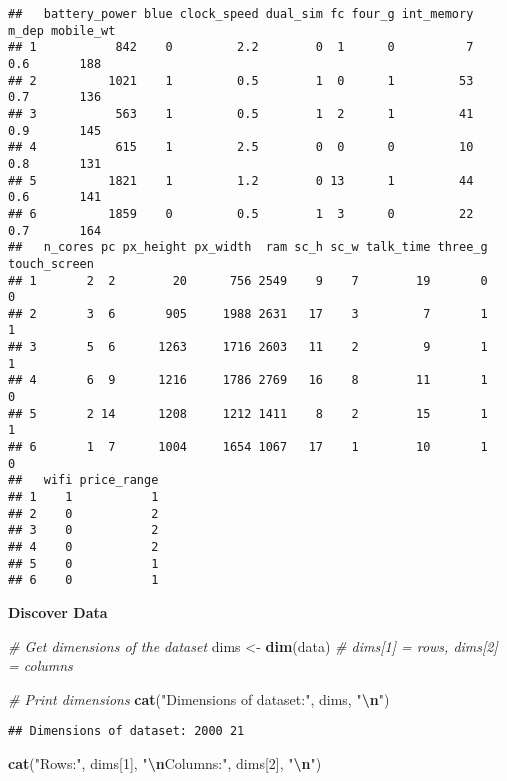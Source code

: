 \documentclass[
]{article}
\newenvironment{Shaded}{\begin{snugshade}}{\end{snugshade}}
\newcommand{\CommentTok}[1]{\textcolor[rgb]{0.56,0.35,0.01}{\textit{#1}}}
\newcommand{\DecValTok}[1]{\textcolor[rgb]{0.00,0.00,0.81}{#1}}
\newcommand{\FunctionTok}[1]{\textcolor[rgb]{0.13,0.29,0.53}{\textbf{#1}}}
\newcommand{\NormalTok}[1]{#1}
\newcommand{\OtherTok}[1]{\textcolor[rgb]{0.56,0.35,0.01}{#1}}
\newcommand{\SpecialCharTok}[1]{\textcolor[rgb]{0.81,0.36,0.00}{\textbf{#1}}}
\newcommand{\StringTok}[1]{\textcolor[rgb]{0.31,0.60,0.02}{#1}}
\begin{document}
\begin{verbatim}
##   battery_power blue clock_speed dual_sim fc four_g int_memory m_dep mobile_wt
## 1           842    0         2.2        0  1      0          7   0.6       188
## 2          1021    1         0.5        1  0      1         53   0.7       136
## 3           563    1         0.5        1  2      1         41   0.9       145
## 4           615    1         2.5        0  0      0         10   0.8       131
## 5          1821    1         1.2        0 13      1         44   0.6       141
## 6          1859    0         0.5        1  3      0         22   0.7       164
##   n_cores pc px_height px_width  ram sc_h sc_w talk_time three_g touch_screen
## 1       2  2        20      756 2549    9    7        19       0            0
## 2       3  6       905     1988 2631   17    3         7       1            1
## 3       5  6      1263     1716 2603   11    2         9       1            1
## 4       6  9      1216     1786 2769   16    8        11       1            0
## 5       2 14      1208     1212 1411    8    2        15       1            1
## 6       1  7      1004     1654 1067   17    1        10       1            0
##   wifi price_range
## 1    1           1
## 2    0           2
## 3    0           2
## 4    0           2
## 5    0           1
## 6    0           1
\end{verbatim}

\textbf{Discover Data}

\begin{Shaded}
\begin{Highlighting}[]
\CommentTok{\# Get dimensions of the dataset}
\NormalTok{dims }\OtherTok{\textless{}{-}} \FunctionTok{dim}\NormalTok{(data)  }\CommentTok{\# dims[1] = rows, dims[2] = columns}

\CommentTok{\# Print dimensions}
\FunctionTok{cat}\NormalTok{(}\StringTok{"Dimensions of dataset:"}\NormalTok{, dims, }\StringTok{"}\SpecialCharTok{\textbackslash{}n}\StringTok{"}\NormalTok{)}
\end{Highlighting}
\end{Shaded}

\begin{verbatim}
## Dimensions of dataset: 2000 21
\end{verbatim}

\begin{Shaded}
\begin{Highlighting}[]
\FunctionTok{cat}\NormalTok{(}\StringTok{"Rows:"}\NormalTok{, dims[}\DecValTok{1}\NormalTok{], }\StringTok{"}\SpecialCharTok{\textbackslash{}n}\StringTok{Columns:"}\NormalTok{, dims[}\DecValTok{2}\NormalTok{], }\StringTok{"}\SpecialCharTok{\textbackslash{}n}\StringTok{"}\NormalTok{)}
\end{Highlighting}
\end{Shaded}
\end{document}
